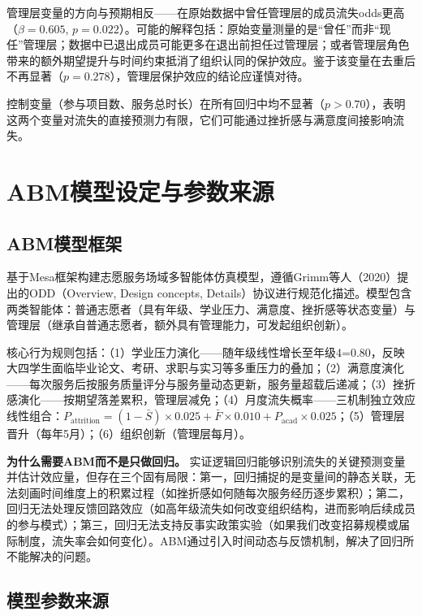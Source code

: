 \documentclass[12pt,a4paper]{article}
\begin{document}
管理层变量的方向与预期相反——在原始数据中曾任管理层的成员流失odds更高（$\beta = 0.605$, $p = 0.022$）。可能的解释包括：原始变量测量的是“曾任”而非“现任”管理层；数据中已退出成员可能更多在退出前担任过管理层；或者管理层角色带来的额外期望提升与时间约束抵消了组织认同的保护效应。鉴于该变量在去重后不再显著（$p = 0.278$），管理层保护效应的结论应谨慎对待。

控制变量（参与项目数、服务总时长）在所有回归中均不显著（$p > 0.70$），表明这两个变量对流失的直接预测力有限，它们可能通过挫折感与满意度间接影响流失。

\section{ABM模型设定与参数来源}

\subsection{ABM模型框架}

基于Mesa框架构建志愿服务场域多智能体仿真模型，遵循Grimm等人（2020）提出的ODD（Overview, Design concepts, Details）协议进行规范化描述。模型包含两类智能体：普通志愿者（具有年级、学业压力、满意度、挫折感等状态变量）与管理层（继承自普通志愿者，额外具有管理能力，可发起组织创新）。

核心行为规则包括：（1）学业压力演化——随年级线性增长至年级4=0.80，反映大四学生面临毕业论文、考研、求职与实习等多重压力的叠加；（2）满意度演化——每次服务后按服务质量评分与服务量动态更新，服务量超载后递减；（3）挫折感演化——按期望落差累积，管理层减免；（4）月度流失概率——三机制独立效应线性组合：$P_{\text{attrition}} = (1-\bar{S})\times0.025 + \bar{F}\times0.010 + P_{\text{acad}}\times0.025$；（5）管理层晋升（每年5月）；（6）组织创新（管理层每月）。

\textbf{为什么需要ABM而不是只做回归。} 实证逻辑回归能够识别流失的关键预测变量并估计效应量，但存在三个固有局限：第一，回归捕捉的是变量间的静态关联，无法刻画时间维度上的积累过程（如挫折感如何随每次服务经历逐步累积）；第二，回归无法处理反馈回路效应（如高年级流失如何改变组织结构，进而影响后续成员的参与模式）；第三，回归无法支持反事实政策实验（如果我们改变招募规模或届际制度，流失率会如何变化）。ABM通过引入时间动态与反馈机制，解决了回归所不能解决的问题。

\subsection{模型参数来源}
\end{document}
